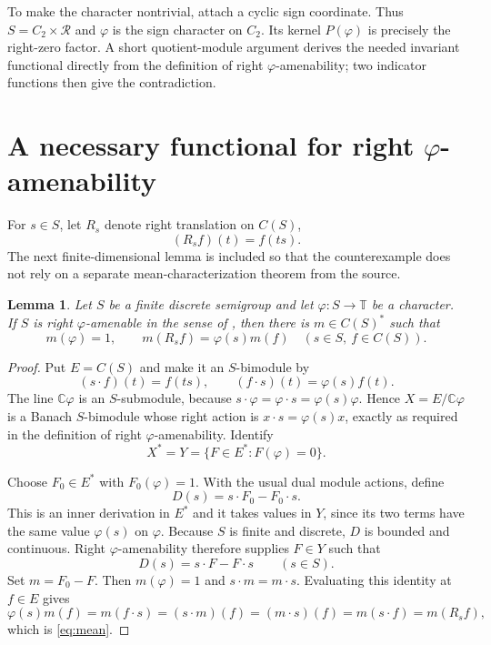 \documentclass[11pt]{article}
\newtheorem{lemma}{Lemma}
\newcommand{\C}{\mathbb C}
\newcommand{\T}{\mathbb T}
\newcommand{\R}{\mathcal R}
\begin{document}
To make the character nontrivial, attach a cyclic sign coordinate.  Thus
$S=C_2\times\R$ and $\varphi$ is the sign character on $C_2$.  Its kernel
$P(\varphi)$ is precisely the right-zero factor.  A short quotient-module
argument derives the needed invariant functional directly from the definition
of right $\varphi$-amenability; two indicator functions then give the
contradiction.

\section{A necessary functional for right $\varphi$-amenability}

For $s\in S$, let $R_s$ denote right translation on $C(S)$,
\[
 (R_sf)(t)=f(ts).
\]
The next finite-dimensional lemma is included so that the counterexample does
not rely on a separate mean-characterization theorem from the source.

\begin{lemma}\label{lem:mean}
Let $S$ be a finite discrete semigroup and let $\varphi:S\to\T$ be a
character.  If $S$ is right $\varphi$-amenable in the sense of \cite{JEG},
then there is $m\in C(S)^*$ such that
\begin{equation}\label{eq:mean}
 m(\varphi)=1,
 \qquad m(R_sf)=\varphi(s)m(f)
 \quad(s\in S,\ f\in C(S)).
\end{equation}
\end{lemma}

\begin{proof}
Put $E=C(S)$ and make it an $S$-bimodule by
\[
 (s\cdot f)(t)=f(ts),
 \qquad (f\cdot s)(t)=\varphi(s)f(t).
\]
The line $\C\varphi$ is an $S$-submodule, because
$s\cdot\varphi=\varphi\cdot s=\varphi(s)\varphi$.  Hence
$X=E/\C\varphi$ is a Banach $S$-bimodule whose right action is
$x\cdot s=\varphi(s)x$, exactly as required in the definition of right
$\varphi$-amenability.  Identify
\[
 X^*=Y=\{F\in E^*:F(\varphi)=0\}.
\]

Choose $F_0\in E^*$ with $F_0(\varphi)=1$.  With the usual dual module
actions, define
\[
 D(s)=s\cdot F_0-F_0\cdot s.
\]
This is an inner derivation in $E^*$ and it takes values in $Y$, since its two
terms have the same value $\varphi(s)$ on $\varphi$.  Because $S$ is finite
and discrete, $D$ is bounded and continuous.  Right $\varphi$-amenability
therefore supplies $F\in Y$ such that
\[
 D(s)=s\cdot F-F\cdot s\qquad(s\in S).
\]
Set $m=F_0-F$.  Then $m(\varphi)=1$ and $s\cdot m=m\cdot s$.  Evaluating this
identity at $f\in E$ gives
\[
 \varphi(s)m(f)=m(f\cdot s)=(s\cdot m)(f)
 =(m\cdot s)(f)=m(s\cdot f)=m(R_sf),
\]
which is \eqref{eq:mean}.
\end{proof}
\end{document}

